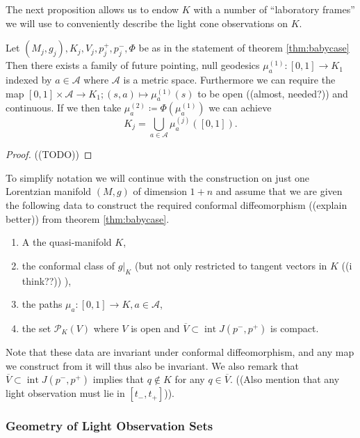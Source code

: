 The next proposition allows us to endow $K$ with a number of \enquote{laboratory frames} we will use to conveniently describe the light cone observations on $K$.
\begin{proposition}
Let $(M_j,g_j), K_j, V_j, p_j^+,p_j^-, \Phi$ be as in the statement of theorem \ref{thm:babycase}
Then there exists a family of future pointing, null geodesics $\mu_a^{(1)}:[0,1]\to K_1$ indexed by $a\in \mathcal{A}$ where $\mathcal{A}$ is a metric space. Furthermore we can require the map $[0,1]\times\mathcal{A}\to K_1; (s,a)\mapsto \mu^{(1)}_a(s)$ to be open ((almost, needed?)) and continuous. If we then take $\mu^{(2)}_a\coloneqq\Phi(\mu^{(1)}_a)$ we can achieve
\begin{equation}\label{eq:frameunion}
K_j = \bigcup_{a\in \mathcal{A}}\mu^{(j)}_a([0,1]).
\end{equation}
\end{proposition}
\begin{proof}
((TODO))
\end{proof}

\begin{remark}\label{rmk:data}To simplify notation we will continue with the construction on just one Lorentzian manifold $(M,g)$ of dimension $1+n$ and assume that we are given the following data to construct the required conformal diffeomorphism ((explain better)) from theorem \ref{thm:babycase}.

\begin{enumerate}
    \item A the quasi-manifold $K$,
    \item the conformal class of $g\rvert_K$ (but not only restricted to tangent vectors in $K$ ((i think??)) ),
    \item the paths $\mu_a:[0,1]\to K, a\in \mathcal{A}$,
    \item the set $\mathcal{P}_K(V)$ where $V$ is open and $\overline{V}\subset \operatorname{int} J(p^-,p^+)$ is compact.
\end{enumerate}
Note that these data are invariant under conformal diffeomorphism, and any map we construct from it will thus also be invariant. We also remark that $\overline{V}\subset \operatorname{int} J(p^-,p^+)$ implies that $q\notin K$ for any $q\in \overline{V}$. ((Also mention that any light observation must lie in $[t_-,t_+]$)).
\end{remark}

\subsubsection{Geometry of Light Observation Sets}


